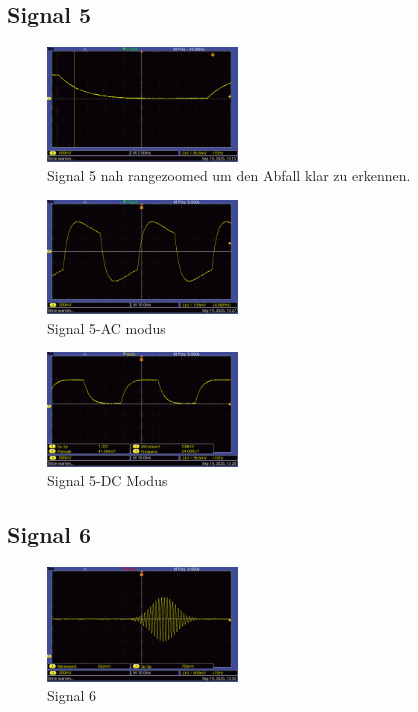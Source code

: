 \subsection*{Signal 5}
\begin{figure} [h!]
    \centering
        \includegraphics[width=0.45\textwidth]{img/25/Signale2/Signal5-Clean.pdf}
    \caption{Signal 5 nah rangezoomed um den Abfall klar zu erkennen.}
\end{figure}

\begin{figure} [h!]
    \centering
        \includegraphics[width=0.45\textwidth]{img/25/Signale2/Signal5-AC.pdf}
    \caption{Signal 5-AC modus}
\end{figure}

\begin{figure} [h!]
    \centering
        \includegraphics[width=0.45\textwidth]{img/25/Signale2/Signal5-DC.pdf}
    \caption{Signal 5-DC Modus}
\end{figure}

\subsection*{Signal 6}
\begin{figure} [h!]
    \centering
        \includegraphics[width=0.45\textwidth]{img/25/Signale2/Signal6.pdf}
    \caption{Signal 6}
\end{figure}

